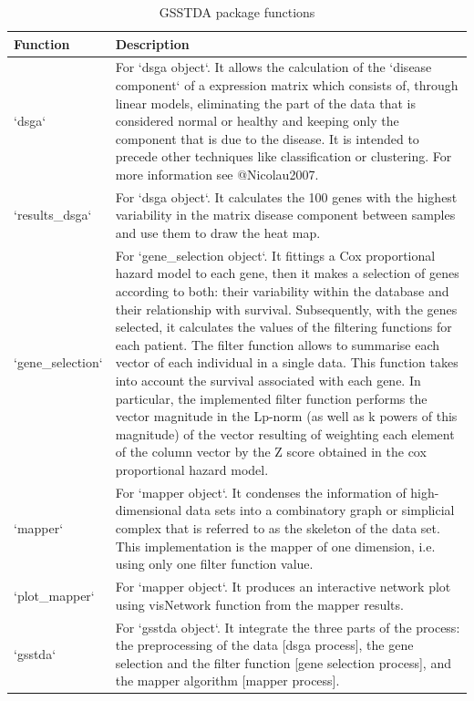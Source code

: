 \begin{table}

\caption{\label{tab:fun-tabl}GSSTDA package functions}
\centering
\begin{tabular}[t]{>{\raggedright\arraybackslash}p{1in}>{\raggedright\arraybackslash}p{4in}}
\toprule
Function & Description\\
\midrule
`dsga` & For `dsga object`. It allows the calculation of the `disease component` of 
 a expression matrix which consists of, through linear models, eliminating the part of the data that is considered normal or healthy and keeping only the 
 component that is due to the  disease. It is intended to precede other techniques like  classification or clustering. 
 For more information see @Nicolau2007.\\
`results\_dsga` & For `dsga object`. It calculates the 100 genes with the highest variability in 
 the matrix disease component between samples and use them to draw the heat map.\\
`gene\_selection` & For `gene\_selection object`. It fittings a Cox proportional hazard model to 
 each gene, then it makes a selection of genes according to both: their variability within the database and their relationship with survival. Subsequently, with the genes selected, it calculates the values of the filtering functions for each patient. 
 The filter function allows to summarise each vector of each individual in a single data. This function takes into account the 
 survival associated with each gene. In particular, the implemented filter function performs the vector magnitude 
 in the Lp-norm (as well as k powers of this magnitude) of the vector resulting of weighting each element of 
 the column vector by the Z score obtained in the cox proportional hazard model.\\
`mapper` & For `mapper object`. It condenses the information of high-dimensional data sets into a combinatory graph or 
 simplicial complex that is referred to as the skeleton of the data set. This implementation is the mapper of 
 one dimension, i.e. using only one filter function value.\\
`plot\_mapper` & For `mapper object`. It produces an interactive network plot using visNetwork 
 function from the mapper results.\\
\addlinespace
`gsstda` & For `gsstda object`. It integrate the three parts of the process: the preprocessing of the data [dsga process], 
 the gene selection and the filter function [gene selection process], and the mapper algorithm [mapper process].\\
\bottomrule
\end{tabular}
\end{table}

